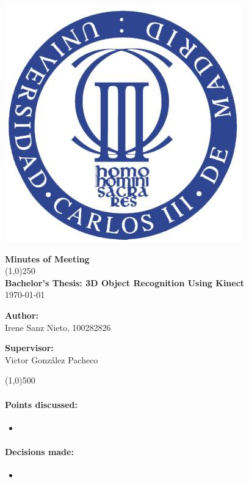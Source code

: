\documentclass{article}
\begin{document}
\includegraphics[width=0.1\linewidth]{./uc3m.jpg}

\vspace{-1cm}
\begin{minipage}[b]{1\linewidth}
	\begin{center}
	{\Huge \bfseries{Minutes of Meeting}}\\
	\line(1,0){250}\\[1cm]
	{\LARGE \textbf{Bachelor's Thesis: 3D Object Recognition Using Kinect}}\\[0.5cm]
	{\large \today}
	\end{center}
\end {minipage}



\begin{minipage}{0.55\textwidth}
\begin{flushleft} \large
\textbf{{Author:}\\}
Irene Sanz Nieto, 100282826\\
\end{flushleft}
\end{minipage}
\begin{minipage}{0.4\textwidth}
\begin{flushright} \large
\textbf{Supervisor: }\\
Victor González Pacheco
\end{flushright}\end{minipage}

\begin{center}
\line(1,0){500}
\end{center}
\vspace{1cm}

\paragraph{\LARGE Points discussed: }
	\begin{itemize}
		\item\textbf{}
	\end{itemize}
	
\vspace{1cm}
\paragraph{\LARGE Decisions made:}
	\begin{itemize}
		\item\textbf{}
	\end{itemize}
\end{document}
